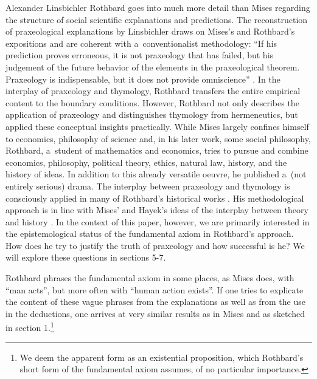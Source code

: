 \begin{artengenv}{Alexander Linsbichler}
Rothbard goes into much more detail than Mises regarding the structure of social scientific explanations and predictions. The reconstruction of praxeological explanations by Linsbichler 
\parencites*[][pp.52–55]{linsbichler_was_2017}[see also][]{gordon_economics_1999} %
 draws on Mises's and Rothbard's expositions and are coherent with a~conventionalist methodology: ``If his prediction proves erroneous, it is not praxeology that has failed, but his judgement of the future behavior of the elements in the praxeological theorem. Praxeology is indispensable, but it does not provide omniscience'' 
\parencite[][p.945]{rothbard_praxeology_1951}. %
 In the interplay of praxeology and thymology, Rothbard transfers the entire empirical content to the boundary conditions. However, Rothbard 
\parencite*[][]{rothbard_hermeneutical_1989} %
 not only describes the application of praxeology and distinguishes thymology from hermeneutics, but applied these conceptual insights practically. While Mises largely confines himself to economics, philosophy of science and, in his later work, some social philosophy, Rothbard, a~student of mathematics and economics, tries to pursue and combine economics, philosophy, political theory, ethics, natural law, history, and the history of ideas. In addition to this already versatile oeuvre, he published a~(not entirely serious) drama. The interplay between praxeology and thymology is consciously applied in many of Rothbard's historical works 
\parencites[][]{rothbard_panic_1962}[][]{rothbard_americas_1963}[][]{rothbard_americas_2000}[][]{rothbard_conceived_1975}[][]{rothbard_conceived_2011}[][]{rothbard_origins_1996}[][]{rothbard_war_2012}[][]{rothbard_history_2020}. %
 His methodological approach is in line with Mises' and Hayek's ideas of the interplay between theory and history 
\parencites[][]{white_methodology_1977}[][p.26]{white_methodology_2003}. %
 In the context of this paper, however, we are primarily interested in the epistemological status of the fundamental axiom in Rothbard's approach. How does he try to justify the truth of praxeology and how successful is he? We will explore these questions in sections 5-7.



Rothbard phrases the fundamental axiom in some places, as Mises does, with ``man acts'', but more often with ``human action exists''. If one tries to explicate the content of these vague phrases from the explanations as well as from the use in the deductions, one arrives at very similar results as in Mises and as sketched in section 1.\footnote{We deem the apparent form as an existential proposition, which Rothbard's short form of the fundamental axiom assumes, of no particular importance.}




\end{artengenv}
